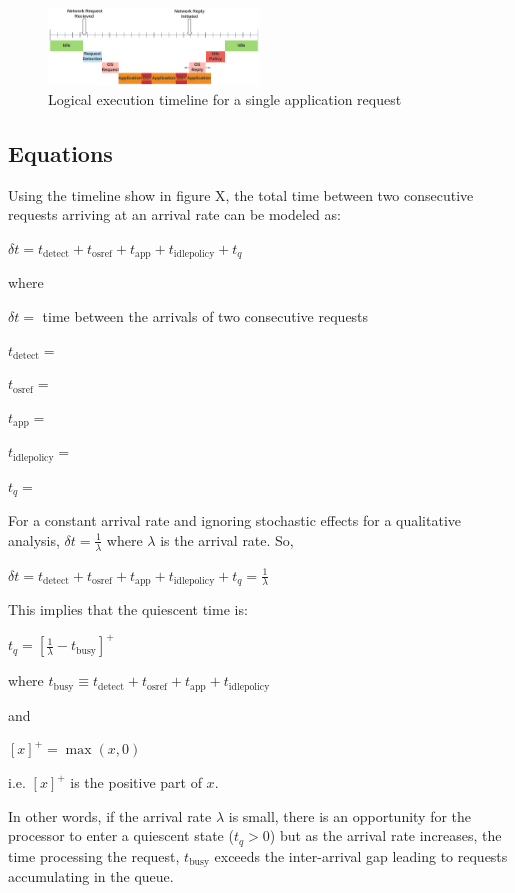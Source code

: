 \label{sec:model}

\begin{figure}
\centering
\includegraphics[width=0.5\textwidth]{figures/timeline_chart}
\caption[]{Logical execution timeline for a single application request}
\label{fig:timeline}
\end{figure}

\subsection{Equations}

Using the timeline show in figure X, the total time between two consecutive requests arriving at an arrival rate can be modeled as:

$\delta t = t_{\text{detect}} + t_{\text{osref}} + t_{\text{app}} + t_{\text{idlepolicy}} + t_q$

where 

$\delta t = $ time between the arrivals of two consecutive requests

$t_{\text{detect}} = $

$t_{\text{osref}} = $

$t_{\text{app}} = $

$t_{\text{idlepolicy}} = $

$t_q = $

For a constant arrival rate and ignoring stochastic effects for a qualitative analysis, $\delta t = \frac{1}{\lambda}$ where $\lambda$ is the arrival rate. So,

$\delta t = t_{\text{detect}} + t_{\text{osref}} + t_{\text{app}} + t_{\text{idlepolicy}} + t_q = \frac{1}{\lambda}$

This implies that the quiescent time is:

$t_q = \left[\frac{1}{\lambda} - t_\text{busy}\right]^+$

where $t_{\text{busy}} \equiv t_{\text{detect}} + t_{\text{osref}} + t_{\text{app}} + t_{\text{idlepolicy}}$

and 

$[x]^+ = \max(x,0)$

i.e. $[x]^+$ is the positive part of $x$.

In other words, if the arrival rate $\lambda$ is small, there is an opportunity for the processor to enter a quiescent state ($t_q > 0$) but as the arrival rate increases, the time processing the request, $t_\text{busy}$ exceeds the inter-arrival gap leading to requests accumulating in the queue. 

